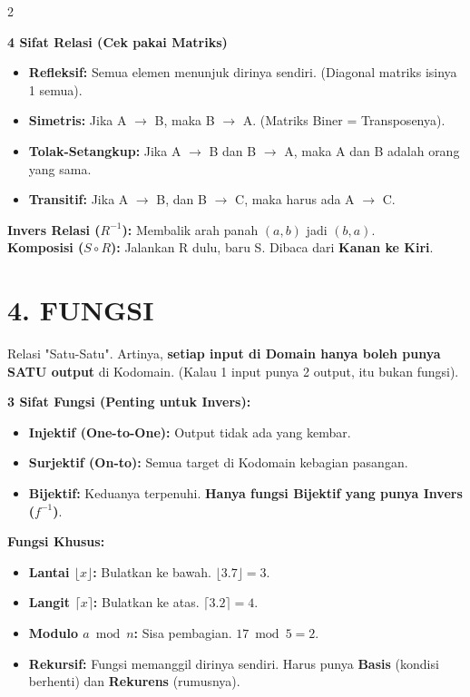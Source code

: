 \documentclass[9pt,a4paper]{extarticle}
\begin{document}
\begin{multicols}{2}
\begin{rumusbox}
\textbf{\textcolor{blue!70!black}{4 Sifat Relasi (Cek pakai Matriks)}} \\
\begin{itemize}
    \item \textbf{Refleksif:} Semua elemen menunjuk dirinya sendiri. (Diagonal matriks isinya 1 semua).
    \item \textbf{Simetris:} Jika A \(\to\) B, maka B \(\to\) A. (Matriks Biner = Transposenya).
    \item \textbf{Tolak-Setangkup:} Jika A \(\to\) B dan B \(\to\) A, maka A dan B adalah orang yang sama.
    \item \textbf{Transitif:} Jika A \(\to\) B, dan B \(\to\) C, maka harus ada A \(\to\) C.
\end{itemize}
\end{rumusbox}

\textbf{Invers Relasi (\(R^{-1}\)):} Membalik arah panah \((a,b)\) jadi \((b,a)\). \\
\textbf{Komposisi (\(S \circ R\)):} Jalankan R dulu, baru S. Dibaca dari \textbf{Kanan ke Kiri}.

\section*{4. FUNGSI}
Relasi "Satu-Satu". Artinya, \textbf{setiap input di Domain hanya boleh punya SATU output} di Kodomain. (Kalau 1 input punya 2 output, itu bukan fungsi).

\begin{rumusbox}
\textbf{\textcolor{blue!70!black}{3 Sifat Fungsi (Penting untuk Invers):}}
\begin{itemize}
    \item \textbf{Injektif (One-to-One):} Output tidak ada yang kembar.
    \item \textbf{Surjektif (On-to):} Semua target di Kodomain kebagian pasangan.
    \item \textbf{Bijektif:} Keduanya terpenuhi. \textbf{Hanya fungsi Bijektif yang punya Invers (\(f^{-1}\))}.
\end{itemize}
\end{rumusbox}

\textbf{Fungsi Khusus:}
\begin{itemize}
    \item \textbf{Lantai \(\lfloor x \rfloor\):} Bulatkan ke bawah. \(\lfloor 3.7 \rfloor = 3\).
    \item \textbf{Langit \(\lceil x \rceil\):} Bulatkan ke atas. \(\lceil 3.2 \rceil = 4\).
    \item \textbf{Modulo \(a \bmod n\):} Sisa pembagian. \(17 \bmod 5 = 2\).
    \item \textbf{Rekursif:} Fungsi memanggil dirinya sendiri. Harus punya \textbf{Basis} (kondisi berhenti) dan \textbf{Rekurens} (rumusnya).
\end{itemize}


\end{multicols}
\end{document}

